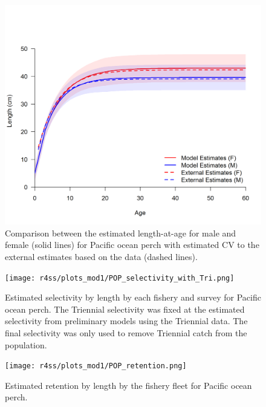 \documentclass[12pt,]{article}
\begin{document}
\FloatBarrier 

\begin{figure}
\centering
\includegraphics{Figures/Growth_Estimate_Comparison.png}
\caption{Comparison between the estimated length-at-age for male and
female (solid lines) for Pacific ocean perch with estimated CV to the
external estimates based on the data (dashed lines).
\label{fig:length_compare}}
\end{figure}

\FloatBarrier 

\begin{figure}
\centering
\texttt{[image: r4ss/plots\_mod1/POP\_selectivity\_with\_Tri.png]}
\caption{Estimated selectivity by length by each fishery and survey for
Pacific ocean perch. The Triennial selectivity was fixed at the
estimated selectivity from preliminary models using the Triennial data.
The final selectivity was only used to remove Triennial catch from the
population. \label{fig:selex}}
\end{figure}

\FloatBarrier 

\begin{figure}
\centering
\texttt{[image: r4ss/plots\_mod1/POP\_retention.png]}
\caption{Estimated retention by length by the fishery fleet for Pacific
ocean perch. \label{fig:retention}}
\end{figure}

\FloatBarrier 
\end{document}

